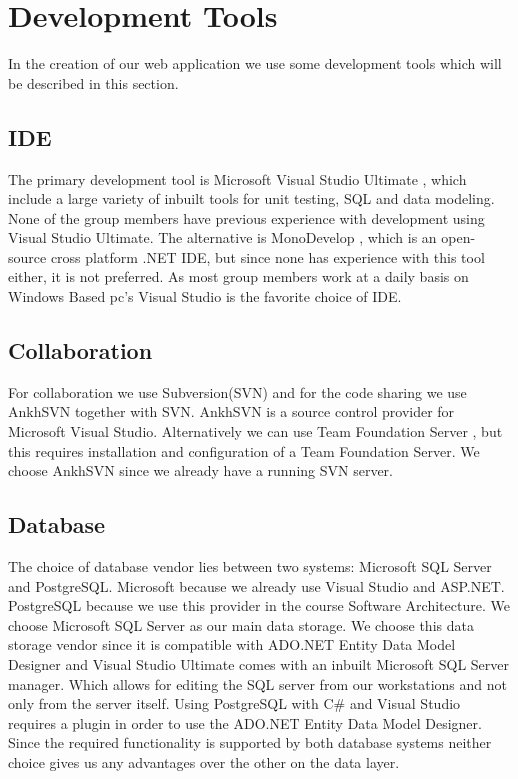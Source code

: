 \section{Development Tools}
In the creation of our web application we use some development tools which will be described in this section. 

\subsection{IDE}
\label{sub:ide}
The primary development tool is Microsoft Visual Studio Ultimate \cite{visualStudio}, which include a large variety of inbuilt tools for unit testing, SQL and data modeling. 
None of the group members have previous experience with development using Visual Studio Ultimate. 
The alternative is MonoDevelop \cite{mono}, which is an open-source cross platform .NET IDE, but since none has experience with this tool either, it is not preferred. 
As most group members work at a daily basis on Windows Based pc's Visual Studio is the favorite choice of IDE. 



\subsection{Collaboration}
\label{sub:collaboration}
For collaboration we use Subversion(SVN) and for the code sharing we use AnkhSVN \cite{ankhsvn} together with SVN. 
AnkhSVN is a source control provider for Microsoft Visual Studio. 
Alternatively we can use Team Foundation Server \cite{teamfoundation}, but this requires installation and configuration of a Team Foundation Server. 
We choose AnkhSVN since we already have a running SVN server. 

\subsection{Database}
\label{sub:database}
The choice of database vendor lies between two systems: Microsoft SQL Server and PostgreSQL. Microsoft because we already use Visual Studio and ASP.NET. PostgreSQL because we use this provider in the course Software Architecture. 
We choose Microsoft SQL Server as our main data storage.
We choose this data storage vendor since it is compatible with ADO.NET Entity Data Model Designer and Visual Studio Ultimate comes with an inbuilt Microsoft SQL Server manager. 
Which allows for editing the SQL server from our workstations and not only from the server itself. 
Using PostgreSQL with C\# and Visual Studio requires a plugin in order to use the ADO.NET Entity Data Model Designer. 
Since the required functionality is supported by both database systems neither choice gives us any advantages over the other on the data layer.